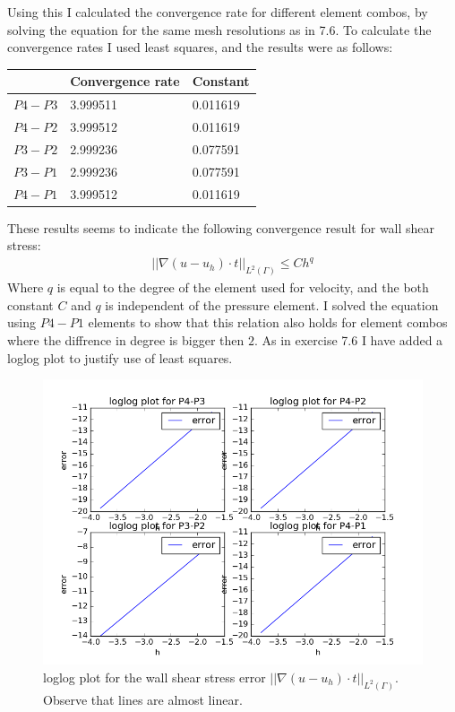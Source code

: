 \documentclass[11pt,a4paper]{report}
\begin{document}
Using this I calculated the convergence rate for different element combos, by solving the equation for the same mesh resolutions as in 7.6. To calculate the convergence rates I used least squares, and the results were as follows:
\begin{center}
    \begin{tabular}{| l | l | l |}
    \hline
     & Convergence rate & Constant   \\ \hline
    $P4-P3$ & 3.999511 & 0.011619    \\ \hline
    $P4-P2$ & 3.999512 & 0.011619	\\ \hline
    $P3-P2$ & 2.999236 & 0.077591    \\ \hline
    $P3-P1$ & 2.999236 & 0.077591	\\ \hline
    	$P4-P1$ & 3.999512 & 0.011619	\\ \hline
    \end{tabular}
\end{center}
These results seems to indicate the following convergence result for wall shear stress:
\begin{align*}
||\nabla (u-u_h)\cdot t||_{L^2(\Gamma)} \leq Ch^q
\end{align*} 
Where $q$ is equal to the degree of the element used for velocity, and the both constant $C$ and $q$ is independent of the pressure element. I solved the equation using $P4-P1$ elements to show that this relation also holds for element combos where the diffrence in degree is bigger then $2$. As in exercise 7.6 I have added a loglog plot to justify use of least squares.
\begin{figure}
  \includegraphics[width=\linewidth]{stress_con.png}
  \caption{loglog plot for the wall shear stress error $||\nabla (u-u_h)\cdot t||_{L^2(\Gamma)}$. Observe that lines are almost linear.}
  \label{Fig 2}
\end{figure}
\end{document}
